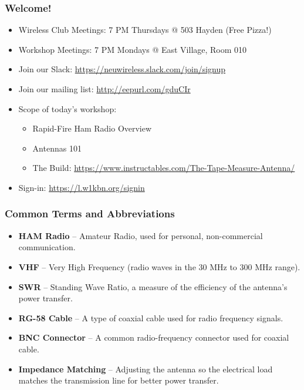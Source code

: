 \documentclass{beamer}
\begin{document}
\begin{frame}
    \frametitle{Welcome!}
    \begin{itemize}
        \item Wireless Club Meetings: 7 PM Thursdays @ 503 Hayden (Free Pizza!)
        \item Workshop Meetings: 7 PM Mondays @ East Village, Room 010
        \item Join our Slack: \url{https://neuwireless.slack.com/join/signup}
        \item Join our mailing list: \url{http://eepurl.com/gduCIr}
        \item Scope of today's workshop:
        \begin{itemize}
            \item Rapid-Fire Ham Radio Overview
            \item Antennas 101
            \item The Build: \url{https://www.instructables.com/The-Tape-Measure-Antenna/}
        \end{itemize}
        \item Sign-in: \url{https://l.w1kbn.org/signin}
    \end{itemize}
\end{frame}

\begin{frame}
    \frametitle{Common Terms and Abbreviations}
    \begin{itemize}
        \item \textbf{HAM Radio} – Amateur Radio, used for personal, non-commercial communication.
        \item \textbf{VHF} – Very High Frequency (radio waves in the 30 MHz to 300 MHz range).
        \item \textbf{SWR} – Standing Wave Ratio, a measure of the efficiency of the antenna's power transfer.
        \item \textbf{RG-58 Cable} – A type of coaxial cable used for radio frequency signals.
        \item \textbf{BNC Connector} – A common radio-frequency connector used for coaxial cable.
        \item \textbf{Impedance Matching} – Adjusting the antenna so the electrical load matches the transmission line for better power transfer.
    \end{itemize}
\end{frame}
\end{document}
